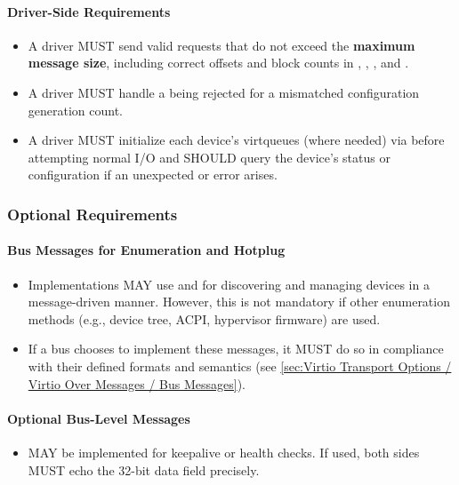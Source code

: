 \paragraph{Driver-Side Requirements}
\begin{itemize}
  \item A driver MUST send valid requests that do not exceed
    the \textbf{maximum message size}, including correct offsets and block
    counts in , , ,
    and .
  \item A driver MUST handle a  being rejected for a
    mismatched configuration generation count.
  \item A driver MUST initialize each device's virtqueues (where needed)
    via  before attempting normal I/O and SHOULD
    query the device's status or configuration if an unexpected
     or error arises.
\end{itemize}

\subsubsection{Optional Requirements}
\label{sec:Virtio Transport Options / Virtio Over Messages / Compliance / Optional}

\paragraph{Bus Messages for Enumeration and Hotplug}
\begin{itemize}
  \item Implementations MAY use 
    and  for discovering and managing devices in a
    message-driven manner. However, this is not mandatory if other enumeration
    methods (e.g., device tree, ACPI, hypervisor firmware) are used.
  \item If a bus chooses to implement these messages, it MUST do
    so in compliance with their defined formats and semantics (see
    \ref{sec:Virtio Transport Options / Virtio Over Messages / Bus Messages}).
\end{itemize}

\paragraph{Optional Bus-Level Messages}
\begin{itemize}
  \item {} MAY be implemented for keepalive or health checks.
    If used, both sides MUST echo the 32-bit data field precisely.
\end{itemize}

